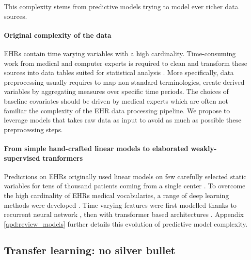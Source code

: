 \documentclass[french,12pt,twoside,a4paper]{book}
\begin{document}
This complexity stems from predictive models trying to model ever richer data
sources.

\paragraph{Original complexity of the data}
EHRs contain time varying variables with a high cardinality. Time-consuming work
from medical and computer experts is required to clean and transform these
sources into data tables suited for statistical analysis
\citep{bacry2020scalpel3,hripcsak2015observational}. More specifically, data
preprocessing usually requires to map non standard terminologies, create derived
variables by aggregating measures over specific time periods. The choices of
baseline covariates should be driven by medical experts which are often not
familiar the complexity of the EHR data processing pipeline. We propose to leverage models that takes raw
data as input to avoid as much as possible these preprocessing steps.


\paragraph{From simple hand-crafted linear models to elaborated weakly-supervised tranformers}

Predictions on EHRs originally used linear models on few carefully selected
static variables for tens of thousand patients coming from a single center
\citep{goldstein2017opportunities}. To overcome the high cardinality of EHRs
medical vocabularies, a range of deep learning methods were developed
\citep{shickel2017deep}. Time varying features were first modelled thanks to
recurrent neural network \citep{lipton2016learning}, then with transformer based
architectures \citep{li2020behrt}. Appendix \ref{apd:review_models} further
details this evolution of predictive model complexity.


 \subsection{Transfer learning: no silver bullet}%
\label{subsec:predictive_models:low_prevalence}%
\end{document}
